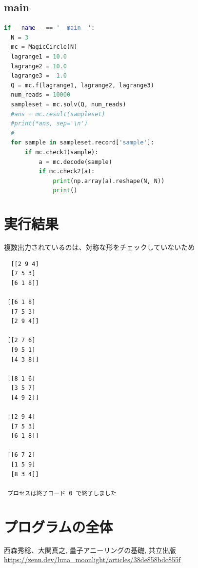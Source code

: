 \documentclass[uplatex,dvipdfmx,a4paper,11pt,oneside,openany]{jsbook}
\begin{document}
\subsection{main}

\begin{lstlisting}[language=Python]
if __name__ == '__main__':
  N = 3
  mc = MagicCircle(N)
  lagrange1 = 10.0
  lagrange2 = 10.0
  lagrange3 =  1.0
  Q = mc.f(lagrange1, lagrange2, lagrange3)
  num_reads = 10000
  sampleset = mc.solv(Q, num_reads)
  #ans = mc.result(sampleset)
  #print(*ans, sep='\n')
  #
  for sample in sampleset.record['sample']:
      if mc.check1(sample):
          a = mc.decode(sample)
          if mc.check2(a):
              print(np.array(a).reshape(N, N))
              print()
\end{lstlisting}


\section{実行結果}

複数出力されているのは、対称な形をチェックしていないため

\begin{verbatim}
  [[2 9 4]
  [7 5 3]
  [6 1 8]]

 [[6 1 8]
  [7 5 3]
  [2 9 4]]

 [[2 7 6]
  [9 5 1]
  [4 3 8]]

 [[8 1 6]
  [3 5 7]
  [4 9 2]]

 [[2 9 4]
  [7 5 3]
  [6 1 8]]

 [[6 7 2]
  [1 5 9]
  [8 3 4]]

 プロセスは終了コード 0 で終了しました
\end{verbatim}

\section{プログラムの全体}



\begin{thebibliography}{9}
   西森秀稔、大関真之, 量子アニーリングの基礎, 共立出版
   \url{https://zenn.dev/luna_moonlight/articles/38de858bdc855f}
\end{thebibliography}
\end{document}
